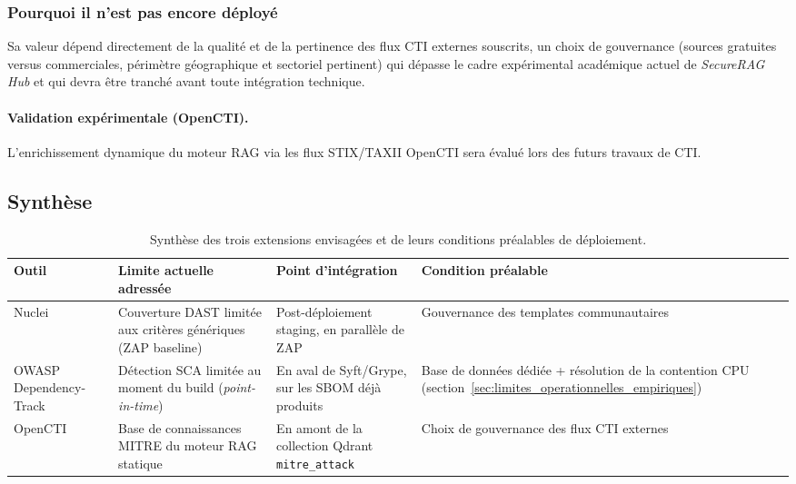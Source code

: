 \subsubsection{Pourquoi il n'est pas encore déployé}
Sa valeur dépend directement de la qualité et de la pertinence des flux CTI externes souscrits, un choix de gouvernance (sources gratuites versus commerciales, périmètre géographique et sectoriel pertinent) qui dépasse le cadre expérimental académique actuel de \textit{SecureRAG Hub} et qui devra être tranché avant toute intégration technique.

\paragraph{Validation expérimentale (OpenCTI).} L'enrichissement dynamique du moteur RAG via les flux STIX/TAXII OpenCTI sera évalué lors des futurs travaux de CTI.


\subsection{Synthèse}

\begin{table}[H]
\centering
\scriptsize
\begin{tabular}{@{}p{2.6cm}p{5cm}p{3cm}p{3cm}@{}}
\toprule
\textbf{Outil} & \textbf{Limite actuelle adressée} & \textbf{Point d'intégration} & \textbf{Condition préalable} \\
\midrule
Nuclei & Couverture DAST limitée aux critères génériques (ZAP baseline) & Post-déploiement staging, en parallèle de ZAP & Gouvernance des templates communautaires \\
OWASP Dependency-Track & Détection SCA limitée au moment du build (\textit{point-in-time}) & En aval de Syft/Grype, sur les SBOM déjà produits & Base de données dédiée + résolution de la contention CPU (section~\ref{sec:limites_operationnelles_empiriques}) \\
OpenCTI & Base de connaissances MITRE du moteur RAG statique & En amont de la collection Qdrant \texttt{mitre\_attack} & Choix de gouvernance des flux CTI externes \\
\bottomrule
\end{tabular}
\caption{Synthèse des trois extensions envisagées et de leurs conditions préalables de déploiement.}
\label{tab:perspectives_outils_synthese}
\end{table}



